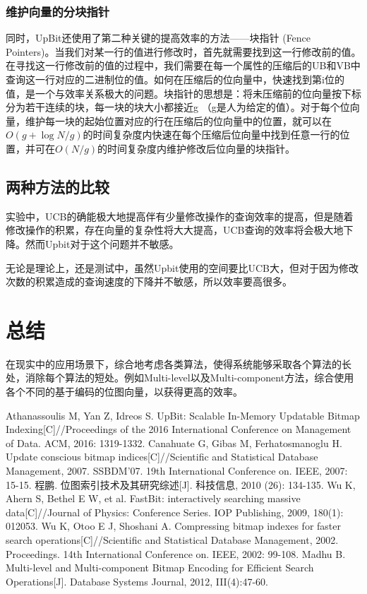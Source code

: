 \documentclass[11pt, a4paper]{article}
\begin{document}
  \subsubsection{维护向量的分块指针}

  同时，UpBit还使用了第二种关键的提高效率的方法——块指针 (Fence Pointers)。当我们对某一行的值进行修改时，首先就需要找到这一行修改前的值。在寻找这一行修改前的值的过程中，我们需要在每一个属性的压缩后的UB和VB中查询这一行对应的二进制位的值。如何在压缩后的位向量中，快速找到第i位的值，是一个与效率关系极大的问题。块指针的思想是：将未压缩前的位向量按下标分为若干连续的块，每一块的块大小都接近g （g是人为给定的值）。对于每个位向量，维护每一块的起始位置对应的行在压缩后的位向量中的位置，就可以在$O(g+\log N/g)$的时间复杂度内快速在每个压缩后位向量中找到任意一行的位置，并可在$O(N/g)$的时间复杂度内维护修改后位向量的块指针。

  \subsection{两种方法的比较}

  实验中，UCB的确能极大地提高伴有少量修改操作的查询效率的提高，但是随着修改操作的积累，存在向量的复杂性将大大提高，UCB查询的效率将会极大地下降。然而Upbit对于这个问题并不敏感。

  无论是理论上，还是测试中，虽然Upbit使用的空间要比UCB大，但对于因为修改次数的积累造成的查询速度的下降并不敏感，所以效率要高很多。

  \section{总结}

  在现实中的应用场景下，综合地考虑各类算法，使得系统能够采取各个算法的长处，消除每个算法的短处。例如Multi-level以及Multi-component方法\cite{art6}，综合使用各个不同的基于编码的位图向量，以获得更高的效率。

\renewcommand\refname{参考文献}
\begin{thebibliography}{99}
Athanassoulis M, Yan Z, Idreos S. UpBit: Scalable In-Memory Updatable Bitmap Indexing[C]//Proceedings of the 2016 International Conference on Management of Data. ACM, 2016: 1319-1332.
Canahuate G, Gibas M, Ferhatosmanoglu H. Update conscious bitmap indices[C]//Scientific and Statistical Database Management, 2007. SSBDM'07. 19th International Conference on. IEEE, 2007: 15-15.
程鹏. 位图索引技术及其研究综述[J]. 科技信息, 2010 (26): 134-135.
Wu K, Ahern S, Bethel E W, et al. FastBit: interactively searching massive data[C]//Journal of Physics: Conference Series. IOP Publishing, 2009, 180(1): 012053.
Wu K, Otoo E J, Shoshani A. Compressing bitmap indexes for faster search operations[C]//Scientific and Statistical Database Management, 2002. Proceedings. 14th International Conference on. IEEE, 2002: 99-108.
Madhu B. Multi-level and Multi-component Bitmap Encoding for Efficient Search Operations[J]. Database Systems Journal, 2012, III(4):47-60.

\end{thebibliography}
\end{document}
